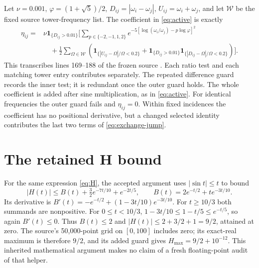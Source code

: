 \documentclass[11pt,a4paper]{article}
\theoremstyle{remark}\newtheorem{remark}[theorem]{Remark}
\newcommand{\ind}{\mathbf 1}
\numberwithin{equation}{section}
\begin{document}
Let $\nu=0.001$, $\varphi=(1+\sqrt5)/2$,
$D_{ij}=|\omega_i-\omega_j|$, $U_{ij}=\omega_i+\omega_j$, and let
$\mathcal W$ be the fixed source tower-frequency list.
The coefficient in \eqref{eq:active} is exactly
\begin{equation}
\begin{aligned}
\eta_{ij}={}&\nu\ind_{\{D_{ij}>0.01\}}
\Bigg[
\sum_{p\in\{-2,-1,1,2\}}
e^{-5[\log(\omega_i/\omega_j)-p\log\varphi]^2}\\
&\quad+\frac12\sum_{\Omega\in\mathcal W}
\left(
\ind_{\{|U_{ij}-\Omega|/\Omega<0.2\}}
+\ind_{\{D_{ij}>0.01\}}
 \ind_{\{|D_{ij}-\Omega|/\Omega<0.2\}}
\right)
\Bigg].
\end{aligned}\label{eq:eta}
\end{equation}
This transcribes lines 169--188 of the frozen source \cite{T}.
Each ratio test and each matching tower entry contributes separately.
The repeated difference guard records the inner test; it is redundant
once the outer guard holds. The whole coefficient is added after sine
multiplication, as in \eqref{eq:active}.
For identical frequencies the outer guard fails and $\eta_{ij}=0$.
Within fixed incidences the coefficient has no positional derivative,
but a changed selected identity contributes the last two terms of
\eqref{eq:exchange-jump}.

\section{The retained H bound}\label{app:H}

For the same expression \eqref{eq:H}, the accepted argument
\cite[lines 185--195]{G} uses $|\sin t|\le t$ to bound
\[
|H(t)|\le B(t)+\tfrac32e^{-7t/10}+e^{-2t/5},
\qquad B(t)=2e^{-t/2}+te^{-3t/10}.
\]
Its derivative is
$B'(t)=-e^{-t/2}+(1-3t/10)e^{-3t/10}$.
For $t\ge10/3$ both summands are nonpositive.
For $0\le t<10/3$,
$1-3t/10\le1-t/5\le e^{-t/5}$, so again $B'(t)\le0$.
Thus $B(t)\le2$ and $|H(t)|\le2+3/2+1=9/2$, attained at zero.
The source's 50,000-point grid on $[0,100]$ includes zero; its exact-real
maximum is therefore $9/2$, and its added guard gives $H_{\max}=9/2+10^{-12}$.
This inherited mathematical argument makes no claim of a fresh
floating-point audit of that helper.
\end{document}
